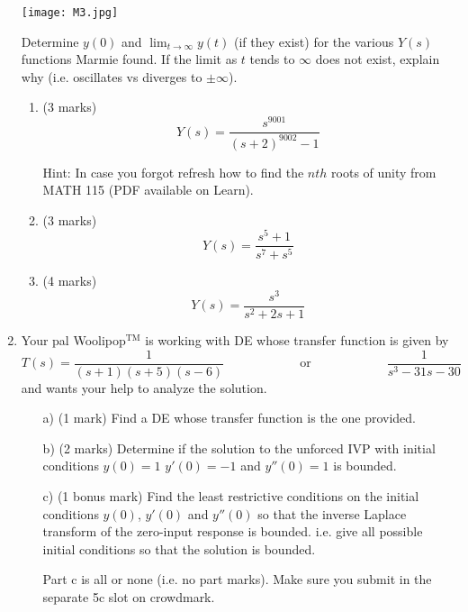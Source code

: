 \documentclass[11pt,a4paper]{article}
\begin{document}
\begin{enumerate}
		\begin{center}
			\texttt{[image: M3.jpg]}
		\end{center}
		
		
		
		Determine $y(0)$ and $\lim_{t\to \infty} y(t)$ (if they exist) for the various $Y(s)$ functions Marmie found. If the limit as $t$ tends to $\infty$ does not exist, explain why (i.e. oscillates vs diverges to $\pm\infty$).
		
		\begin{enumerate}
			\item (3 marks)\[
			Y(s)=\frac{s^{9001}}{(s+2)^{9002}-1} 
			\]
			
			Hint: In case you forgot refresh how to find the $nth$ roots of unity from MATH 115 (PDF available on Learn).
			
			\item (3 marks)\[
			Y(s)=\frac {s^5+1}{s^7+s^5}
			\]
			
			\item (4 marks)
			\[
			Y(s)=\frac{s^3}{s^2+2s+1}
			\]
		\end{enumerate}
		
		

		
		\item Your pal Woolipop$^\text{TM}$ is working with  DE whose transfer function is given by 
		\[
		T(s)=\frac{1}{(s+1)(s+5)(s-6)}\hspace{1in}\text{or}\hspace{1in}\frac{1}{s^3-31s-30}
		\]
		and wants your help to analyze the solution.
		
		\begin{enumerate}
			\item[a)] (1 mark) Find a DE whose transfer function is the one provided. 
			\item[b)] (2 marks) Determine if the solution to the unforced IVP with initial conditions $y(0)=1$ $y'(0)=-1$ and $y''(0)=1$ is bounded.
			\item[c)] (1 bonus mark) Find the least restrictive conditions on the initial conditions $y(0)$, $y'(0)$ and $y''(0)$ so that the inverse Laplace transform of the zero-input response is bounded. i.e. give all possible initial conditions so that the solution is bounded.
			
			Part c is all or none (i.e. no part marks). Make sure you submit in the separate 5c slot on crowdmark.
		\end{enumerate}
	
		
		
		
		
	\end{enumerate}
	
	

	

	
	
\end{document}
